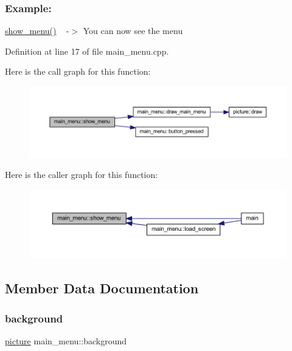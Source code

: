  \subsubsection*{Example\+: }

\hyperlink{classmain__menu_ac653f7645e7dab1807f141ba2395dc5c}{show\+\_\+menu()} ~\newline
-\/$>$ You can now see the menu 

Definition at line 17 of file main\+\_\+menu.\+cpp.

Here is the call graph for this function\+:
\nopagebreak
\begin{figure}[H]
\begin{center}
\leavevmode
\includegraphics[width=350pt]{classmain__menu_ac653f7645e7dab1807f141ba2395dc5c_cgraph}
\end{center}
\end{figure}
Here is the caller graph for this function\+:
\nopagebreak
\begin{figure}[H]
\begin{center}
\leavevmode
\includegraphics[width=350pt]{classmain__menu_ac653f7645e7dab1807f141ba2395dc5c_icgraph}
\end{center}
\end{figure}


\subsection{Member Data Documentation}
\mbox{\label{classmain__menu_a322ab524817b0c59d040962cef7c7295}} 
\subsubsection{\texorpdfstring{background}{background}}
{\footnotesize\ttfamily \hyperlink{classpicture}{picture} main\+\_\+menu\+::background\hspace{0.3cm}{\ttfamily [private]}}



